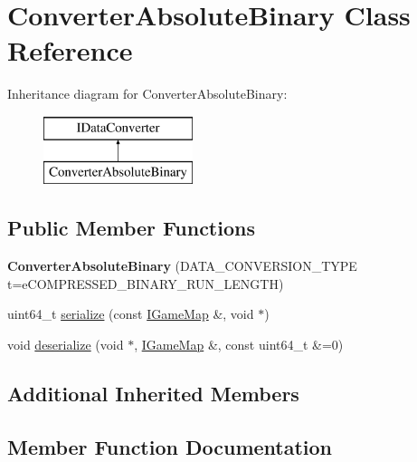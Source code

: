 \hypertarget{class_converter_absolute_binary}{}\section{Converter\+Absolute\+Binary Class Reference}
\label{class_converter_absolute_binary}
Inheritance diagram for Converter\+Absolute\+Binary\+:\begin{figure}[H]
\begin{center}
\leavevmode
\includegraphics[height=2.000000cm]{class_converter_absolute_binary}
\end{center}
\end{figure}
\subsection*{Public Member Functions}
\begin{DoxyCompactItemize}
\item 
\hypertarget{class_converter_absolute_binary_a598344bff82e72e206a969c62541aad7}{}{\bfseries Converter\+Absolute\+Binary} (D\+A\+T\+A\+\_\+\+C\+O\+N\+V\+E\+R\+S\+I\+O\+N\+\_\+\+T\+Y\+P\+E t=e\+C\+O\+M\+P\+R\+E\+S\+S\+E\+D\+\_\+\+B\+I\+N\+A\+R\+Y\+\_\+\+R\+U\+N\+\_\+\+L\+E\+N\+G\+T\+H)\label{class_converter_absolute_binary_a598344bff82e72e206a969c62541aad7}

\item 
uint64\+\_\+t \hyperlink{class_converter_absolute_binary_a18e6d9d1cd5dc0883d102c892fb5d037}{serialize} (const \hyperlink{class_i_game_map}{I\+Game\+Map} \&, void $\ast$)
\item 
void \hyperlink{class_converter_absolute_binary_afe3122c8ad06a1b10f7241c04e1b7ee2}{deserialize} (void $\ast$, \hyperlink{class_i_game_map}{I\+Game\+Map} \&, const uint64\+\_\+t \&=0)
\end{DoxyCompactItemize}
\subsection*{Additional Inherited Members}


\subsection{Member Function Documentation}
\hypertarget{class_converter_absolute_binary_afe3122c8ad06a1b10f7241c04e1b7ee2}{}
